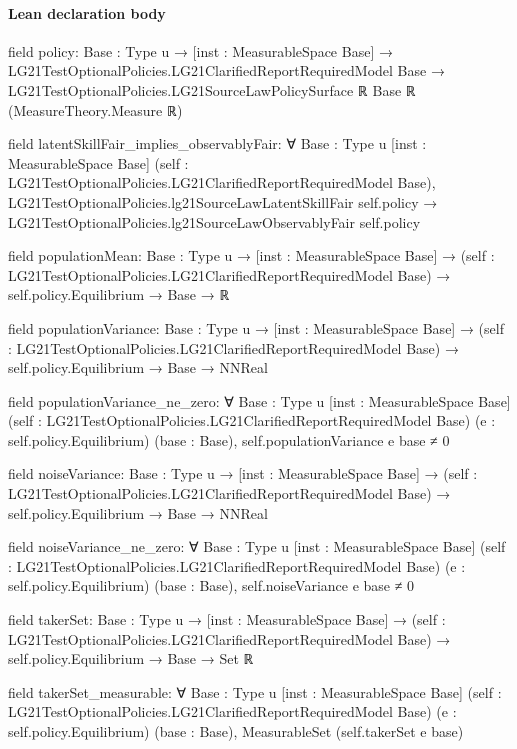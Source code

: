 \documentclass[10pt]{article}
\begin{document}
\paragraph{Lean declaration body}
\begin{ReviewVerbatim}
field policy:
{Base : Type u} →
  [inst : MeasurableSpace Base] →
    LG21TestOptionalPolicies.LG21ClarifiedReportRequiredModel Base →
      LG21TestOptionalPolicies.LG21SourceLawPolicySurface ℝ Base ℝ (MeasureTheory.Measure ℝ)

field latentSkillFair_implies_observablyFair:
∀ {Base : Type u} [inst : MeasurableSpace Base] (self : LG21TestOptionalPolicies.LG21ClarifiedReportRequiredModel Base),
  LG21TestOptionalPolicies.lg21SourceLawLatentSkillFair self.policy →
    LG21TestOptionalPolicies.lg21SourceLawObservablyFair self.policy

field populationMean:
{Base : Type u} →
  [inst : MeasurableSpace Base] →
    (self : LG21TestOptionalPolicies.LG21ClarifiedReportRequiredModel Base) → self.policy.Equilibrium → Base → ℝ

field populationVariance:
{Base : Type u} →
  [inst : MeasurableSpace Base] →
    (self : LG21TestOptionalPolicies.LG21ClarifiedReportRequiredModel Base) → self.policy.Equilibrium → Base → NNReal

field populationVariance_ne_zero:
∀ {Base : Type u} [inst : MeasurableSpace Base] (self : LG21TestOptionalPolicies.LG21ClarifiedReportRequiredModel Base)
  (e : self.policy.Equilibrium) (base : Base), self.populationVariance e base ≠ 0

field noiseVariance:
{Base : Type u} →
  [inst : MeasurableSpace Base] →
    (self : LG21TestOptionalPolicies.LG21ClarifiedReportRequiredModel Base) → self.policy.Equilibrium → Base → NNReal

field noiseVariance_ne_zero:
∀ {Base : Type u} [inst : MeasurableSpace Base] (self : LG21TestOptionalPolicies.LG21ClarifiedReportRequiredModel Base)
  (e : self.policy.Equilibrium) (base : Base), self.noiseVariance e base ≠ 0

field takerSet:
{Base : Type u} →
  [inst : MeasurableSpace Base] →
    (self : LG21TestOptionalPolicies.LG21ClarifiedReportRequiredModel Base) → self.policy.Equilibrium → Base → Set ℝ

field takerSet_measurable:
∀ {Base : Type u} [inst : MeasurableSpace Base] (self : LG21TestOptionalPolicies.LG21ClarifiedReportRequiredModel Base)
  (e : self.policy.Equilibrium) (base : Base), MeasurableSet (self.takerSet e base)


\end{ReviewVerbatim}
\end{document}
